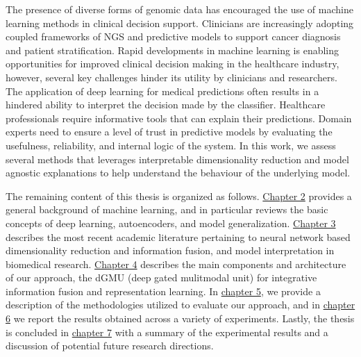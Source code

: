 The presence of diverse forms of genomic data has encouraged the use of machine learning methods in clinical decision support. Clinicians are increasingly adopting coupled frameworks of NGS and predictive models to support cancer diagnosis and patient stratification. Rapid developments in machine learning is enabling opportunities for improved clinical decision making in the healthcare industry, however, several key challenges hinder its utility by clinicians and researchers. The application of deep learning for medical predictions often results in a hindered ability to interpret the decision made by the classifier. Healthcare professionals require informative tools that can explain their predictions. Domain experts need to ensure a level of trust in predictive models by evaluating the usefulness, reliability, and internal logic of the system. In this work, we assess several methods that leverages interpretable dimensionality reduction and model agnostic explanations to help understand the behaviour of the underlying model.

The remaining content of this thesis is organized as follows. \hyperref[chap:background]{Chapter 2} provides a general background of machine learning, and in particular reviews the basic concepts of deep learning, autoencoders, and model generalization. \hyperref[chap:relatedwork]{Chapter 3} describes the most recent academic literature pertaining to neural network based dimensionality reduction and information fusion, and model interpretation in biomedical research. \hyperref[chap:deepgmu]{Chapter 4} describes the main components and architecture of our approach, the dGMU (deep gated mulitmodal unit) for integrative information fusion and representation learning. In \hyperref[chap:materials]{chapter 5}, we provide a description of the methodologies utilized to evaluate our approach, and in \hyperref[chap:results]{chapter 6} we report the results obtained across a variety of experiments. Lastly, the thesis is concluded in \hyperref[chap:conclusion]{chapter 7} with a summary of the experimental results and a discussion of potential future research directions.



